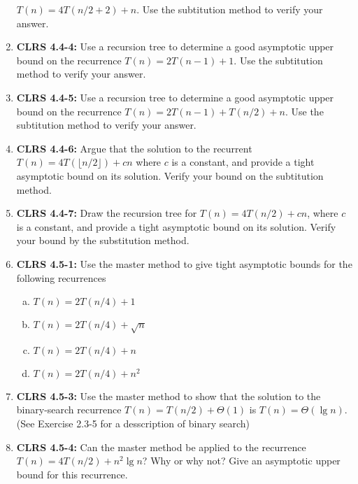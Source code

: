 \documentclass[12pt]{article}
\begin{document}
\begin{enumerate}[1.]
    $T(n) = 4T(n/2 +2) + n$. Use the subtitution method to verify your answer.
    \item \textbf{CLRS 4.4-4:}  Use a recursion tree to determine a good asymptotic upper bound on the recurrence
    $T(n) = 2T(n - 1) + 1$. Use the subtitution method to verify your answer.
    \item \textbf{CLRS 4.4-5:}  Use a recursion tree to determine a good asymptotic upper bound on the recurrence
    $T(n) = 2T(n - 1) + T(n/2) + n$. Use the subtitution method to verify your answer.
    \item \textbf{CLRS 4.4-6:}  Argue that the solution to the recurrent $T(n) = 4 T(\lfloor n/2 \rfloor) + cn$ where
    $c$ is a constant, and provide a tight asymptotic bound on its solution. Verify your bound
    on the subtitution method.
    \item \textbf{CLRS 4.4-7:}  Draw the recursion tree for $T(n) = 4T(n/2) + cn$, where $c$ is a constant, and
    provide a tight asymptotic bound on its solution. Verify your bound by the substitution method.
    \item \textbf{CLRS 4.5-1:}  Use the master method to give tight asymptotic bounds for the following recurrences

    \begin{enumerate}[a)]
        \item $T(n) = 2T(n/4) + 1$
        \item $T(n) = 2T(n/4) + \sqrt{n}$
        \item $T(n) = 2T(n/4) + n$
        \item $T(n) = 2T(n/4) + n^2$
    \end{enumerate}

    \item \textbf{CLRS 4.5-3:} Use the master method to show that the solution to the binary-search
    recurrence $T(n) = T(n/2) + \Theta(1)$ is $T(n) = \Theta(\lg n)$. (See Exercise 2.3-5 for a desscription
    of binary search)

    \item \textbf{CLRS 4.5-4:} Can the master method be applied to the recurrence $T(n) = 4T(n/2) + n^2 \lg n$?
    Why or why not? Give an asymptotic upper bound for this recurrence.
\end{enumerate}
\end{document}

